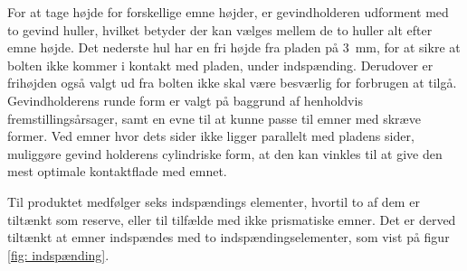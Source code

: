For at tage højde for forskellige emne højder, er gevindholderen udforment med to gevind huller, hvilket betyder der kan vælges mellem de to huller alt efter emne højde. Det nederste hul har en fri højde fra pladen på \SI{3}{mm}, for at sikre at bolten ikke kommer i kontakt med pladen, under indspænding. Derudover er frihøjden også valgt ud fra bolten ikke skal være besværlig for forbrugen at tilgå.
Gevindholderens runde form er valgt på baggrund af henholdvis fremstillingsårsager, samt en evne til at kunne passe til emner med skræve former. Ved emner hvor dets sider ikke ligger parallelt med pladens sider, muliggøre gevind holderens cylindriske form, at den kan vinkles til at give den mest optimale kontaktflade med emnet.


Til produktet medfølger seks indspændings elementer, hvortil to af dem er tiltænkt som reserve, eller til tilfælde med ikke prismatiske emner. Det er derved tiltænkt at emner indspændes med to indspændingselementer, som vist på figur \ref{fig: indspænding}. 

